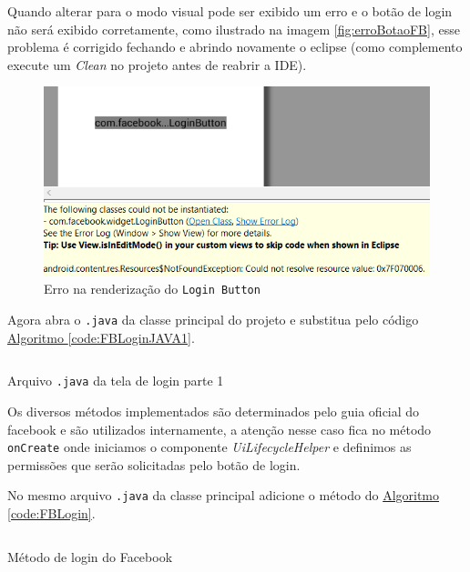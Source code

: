 \documentclass[a4paper,12pt,brazil,oneside]{book}
\begin{document}
	Quando alterar para o modo visual pode ser exibido um erro e o botão de login não será exibido corretamente, como ilustrado na imagem \autoref{fig:erroBotaoFB}, esse problema é corrigido fechando e abrindo novamente o eclipse (como complemento execute um \emph{Clean} no projeto antes de reabrir a IDE).
	
	\begin{figure}[H]
  \centering
  \includegraphics[width=.75\textwidth]{figuras/facebook/errobtnlogin.png}
  \caption{Erro na renderização do \texttt{Login Button}}
  \label{fig:erroBotaoFB}
\end{figure}

	Agora abra o \texttt{.java} da classe principal do projeto e substitua pelo código \hyperref[code:FBLoginJAVA1]{Algoritmo \ref*{code:FBLoginJAVA1}}.
	
	\begin{listing}[H]
	\inputminted[linenos=true,fontsize=\small,frame=lines, framesep=2mm, tabsize=2,numbersep=5pt]{xml}{src/facebook/loginMainActivity.java}
	\caption{Arquivo \texttt{.java} da tela de login parte 1}
	\label{code:FBLoginJAVA1}
	\end{listing}
	
	Os diversos métodos implementados são determinados pelo guia oficial do facebook e são utilizados internamente, a atenção nesse caso fica no método \texttt{onCreate} onde iniciamos o componente \emph{UiLifecycleHelper} e definimos as permissões que serão solicitadas pelo botão de login.
	
	No mesmo arquivo \texttt{.java} da classe principal adicione o método do \hyperref[code:FBLogin]{Algoritmo \ref*{code:FBLogin}}.
	
	\begin{listing}[H]
	\inputminted[linenos=true,fontsize=\small,frame=lines, framesep=2mm, tabsize=2,numbersep=5pt]{xml}{src/facebook/onSessionStateChanged.java}
	\caption{Método de login do Facebook}
	\label{code:FBLogin}
	\end{listing}
	
\end{document}

